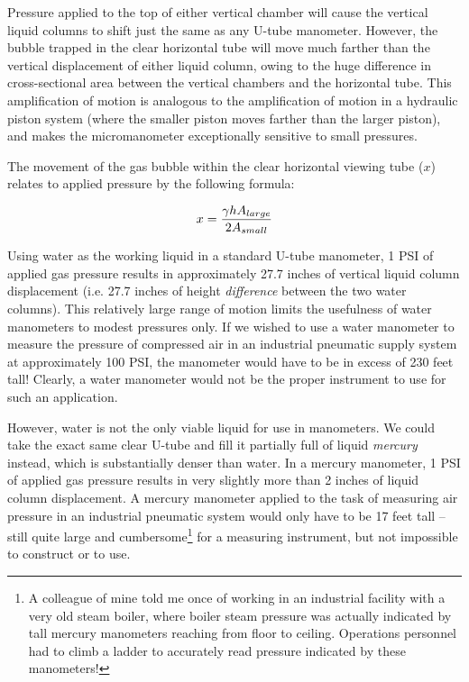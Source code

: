 Pressure applied to the top of either vertical chamber will cause the vertical liquid columns to shift just the same as any U-tube manometer.  However, the bubble trapped in the clear horizontal tube will move much farther than the vertical displacement of either liquid column, owing to the huge difference in cross-sectional area between the vertical chambers and the horizontal tube.  This amplification of motion is analogous to the amplification of motion in a hydraulic piston system (where the smaller piston moves farther than the larger piston), and makes the micromanometer exceptionally sensitive to small pressures.

The movement of the gas bubble within the clear horizontal viewing tube ($x$) relates to applied pressure by the following formula:

$$x = {{\gamma h} A_{large} \over {2 A_{small}}}$$

\vskip 10pt

Using water as the working liquid in a standard U-tube manometer, 1 PSI of applied gas pressure results in approximately 27.7 inches of vertical liquid column displacement (i.e. 27.7 inches of height \textit{difference} between the two water columns).  This relatively large range of motion limits the usefulness of water manometers to modest pressures only.  If we wished to use a water manometer to measure the pressure of compressed air in an industrial pneumatic supply system at approximately 100 PSI, the manometer would have to be in excess of 230 feet tall!  Clearly, a water manometer would not be the proper instrument to use for such an application.

However, water is not the only viable liquid for use in manometers.  We could take the exact same clear U-tube and fill it partially full of liquid \textit{mercury} instead, which is substantially denser than water.  In a mercury manometer, 1 PSI of applied gas pressure results in very slightly more than 2 inches of liquid column displacement.  A mercury manometer applied to the task of measuring air pressure in an industrial pneumatic system would only have to be 17 feet tall -- still quite large and cumbersome\footnote{A colleague of mine told me once of working in an industrial facility with a very old steam boiler, where boiler steam pressure was actually indicated by tall mercury manometers reaching from floor to ceiling.  Operations personnel had to climb a ladder to accurately read pressure indicated by these manometers!} for a measuring instrument, but not impossible to construct or to use.

